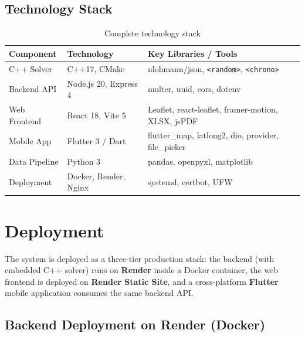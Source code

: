 \documentclass[11pt,a4paper]{article}
\newcommand{\code}[1]{\texttt{#1}}
\begin{document}
\subsection{Technology Stack}

\begin{table}[H]
\centering
\small
\begin{tabular}{lll}
\toprule
\textbf{Component} & \textbf{Technology} & \textbf{Key Libraries / Tools} \\
\midrule
\rowcolor{rowalt}
C++ Solver & C++17, CMake & nlohmann/json, \code{<random>}, \code{<chrono>} \\
Backend API & Node.js 20, Express 4 & multer, uuid, cors, dotenv \\
\rowcolor{rowalt}
Web Frontend & React 18, Vite 5 & Leaflet, react-leaflet, framer-motion, XLSX, jsPDF \\
Mobile App & Flutter 3 / Dart & flutter\_map, latlong2, dio, provider, file\_picker \\
\rowcolor{rowalt}
Data Pipeline & Python 3 & pandas, openpyxl, matplotlib \\
Deployment & Docker, Render, Nginx & systemd, certbot, UFW \\
\bottomrule
\end{tabular}
\caption{Complete technology stack}
\label{tab:stack}
\end{table}

\section{Deployment}
\label{sec:deployment}

The system is deployed as a three-tier production stack: the backend (with embedded C++ solver) runs on \textbf{Render} inside a Docker container, the web frontend is deployed on \textbf{Render Static Site}, and a cross-platform \textbf{Flutter} mobile application consumes the same backend API.

\subsection{Backend Deployment on Render (Docker)}
\end{document}
